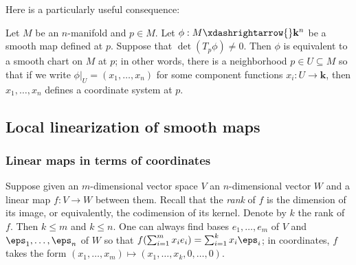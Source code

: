 \documentclass[reqno]{amsart} 
\begin{document}
Here is a particularly useful consequence:
\begin{corollary}
  Let $M$ be an $n$-manifold
  and $p \in M$.
  Let $\phi : M \xdashrightarrow{} \mathbf{k}^n$
  be a smooth map defined at $p$.
  Suppose that $\det(T_p \phi) \neq 0$.
  Then $\phi$ is equivalent to a smooth chart on $M$ at $p$;
  in other words,
  there is a neighborhood $p \in U \subseteq M$
  so that
  if we write $\phi|_U = (x_1,\dotsc,x_n)$
  for some component functions $x_i : U \rightarrow \mathbf{k}$,
  then
  $x_1,\dotsc,x_n$ defines a coordinate system at $p$.
\end{corollary}

\subsection{Local linearization of smooth maps}
\label{sec:org7d02d39}
\subsubsection{Linear maps in terms of coordinates}
\label{sec:org7f15f91}
Suppose given an $m$-dimensional vector space $V$
an $n$-dimensional vector $W$ and a linear
map $f : V \rightarrow W$
between them.
Recall that the \emph{rank} of $f$ is
the dimension of its image, or equivalently,
the codimension of its kernel.
Denote by $k$ the rank of $f$.
Then $k \leq m$ and $k \leq n$.
One can always
find bases $e_1,\dotsc,e_m$ of $V$
and $\eps_1,\dotsc,\eps_n$ of $W$
so that
$f(\sum_{i=1}^m x_i e_i)
= \sum_{i=1}^k x_i \eps_i$;
in coordinates, $f$ takes the form
$(x_1,\dotsc,x_m) \mapsto (x_1,\dotsc,x_k,0,\dotsc,0)$.
\end{document}
